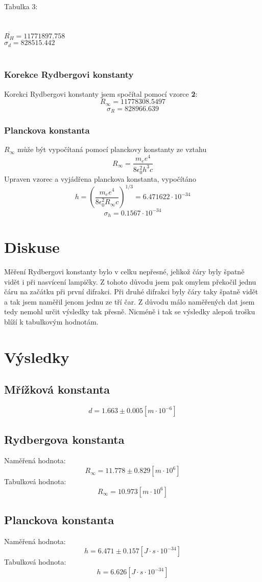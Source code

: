 \documentclass{article}
\begin{document}
\footnotesize{Tabulka 3:}\\
\large{
\\
}
\vspace{1em}
\\
$\overline{R_{H}} = 11 771 897.758$\\
$\sigma_{d} = 828515.442$
\\
\vspace{1em}
\\
\subsubsection{Korekce Rydbergovi konstanty}
Korekci Rydbergovi konstanty jsem spočítal pomocí vzorce \textbf{2}:
$$R_{\infty} = 11 778 308.5497$$
$$\sigma_{R} = 828966.639$$
\subsubsection{Planckova konstanta}
$R_{\infty}$ může být vypočítaná pomocí planckovy konstanty ze vztahu
$$R_{\infty} = \frac{m_{e} e^{4}}{8 \epsilon_{0}^{2} h^{3} c }$$
Upraven vzorec a vyjádřena planckova konstanta, vypočítáno
$$h = \left( \frac{m_{e} e^{4}}{8 \epsilon_{0}^{2} R_{\infty} c} \right)^{1/3} = 6.471622 \cdot 10^{-34}$$
$$\sigma_{h} = 0.1567 \cdot 10^{-34}$$
\section{Diskuse}
Měření Rydbergovi konstanty bylo v celku nepřesné, jelikož čáry byly špatně vidět i při nasvícení lampičky.
Z tohoto důvodu jsem pak omylem překočil jednu čáru na začátku při první difrakci. Při druhé difrakci byly čáry taky špatně vidět a tak jsem naměřil jenom jednu ze tří čar. Z důvodu málo naměřených dat jsem tedy nemohl určit výsledky tak přesně.
Nicméně i tak se výsledky alepoň trošku blíží k tabulkovým hodnotám.
\section{Výsledky}
\subsection{Mřížková konstanta}
$$d = 1.663 \pm 0.005 [m \cdot 10^{-6}]$$
\subsection{Rydbergova konstanta}
Naměřená hodnota:
$$R_{\infty} = 11.778 \pm 0.829 [m \cdot 10^{6}]$$
Tabulková hodnota:
$$R_{\infty} = 10.973 [m \cdot 10^{6}]$$
\subsection{Planckova konstanta}
Naměřená hodnota:
$$h = 6.471 \pm 0.157 [J \cdot s \cdot 10^{-34}]$$
Tabulková hodnota:
$$h = 6.626 [J \cdot s \cdot 10^{-34}]$$
\end{document}
